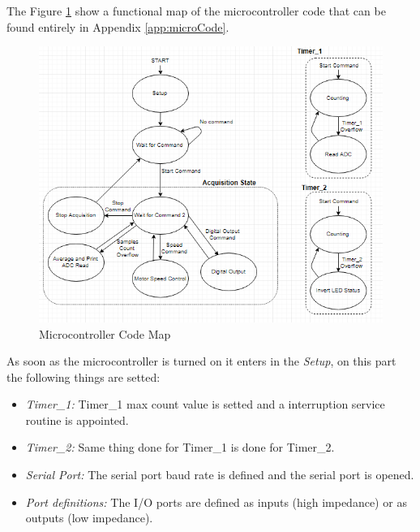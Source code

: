 	The Figure \ref{fig:microCode} show a functional map of the microcontroller code that can be found entirely in Appendix \ref{app:microCode}.
	
	\begin{figure}[htbp]
		\centering
		\includegraphics[scale=1]{figuras/fig-microCodeMap}
		\caption{Microcontroller Code Map \cite{microCodeMap}}
		\label{fig:microCode}
	\end{figure}
	
	
	As soon as the microcontroller is turned on it enters in the \textit{Setup}, on this part the following things are setted:
	\begin{itemize}
		\item \textit{Timer\_1: } Timer\_1 max count value is setted and a interruption service routine is appointed.
		\item \textit{Timer\_2: } Same thing done for Timer\_1 is done for Timer\_2.
		\item \textit{Serial Port: } The serial port baud rate is defined and the serial port is opened.
		\item \textit{Port definitions: } The I/O ports are defined as inputs (high impedance) or as outputs (low impedance).
	\end{itemize}
	

